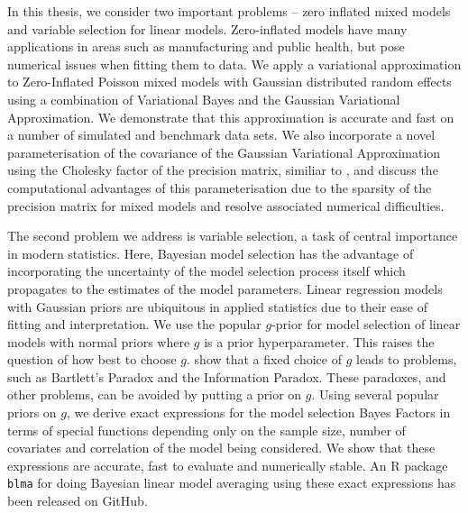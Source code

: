\documentclass[PhD,stats]{usydthesis}[12pt]
\begin{document}
In this thesis, we consider two important problems -- zero inflated mixed models and variable selection for
linear models. Zero-inflated models have many applications in areas such as manufacturing and public health,
but pose numerical issues when fitting them to data. We apply a variational approximation to Zero-Inflated
Poisson mixed models with Gaussian distributed random effects using a combination of Variational Bayes and the
Gaussian Variational Approximation. We demonstrate that this approximation is accurate and fast on a number of
simulated and benchmark data sets. We also incorporate a novel parameterisation of the covariance of the
Gaussian Variational Approximation using the Cholesky factor of the precision matrix, similiar to
\cite{Tan2016}, and discuss the computational advantages of this parameterisation due to the sparsity of the
precision matrix for mixed models and resolve associated numerical difficulties.

The second problem we address is variable selection, a task of central importance in modern statistics. Here,
Bayesian model selection has the advantage of incorporating the uncertainty of the model selection process
itself which propagates to the estimates of the model  parameters. Linear regression models with Gaussian
priors are ubiquitous in applied statistics due to their ease of fitting and interpretation. We use the
popular $g$-prior \cite{Zellner1986} for model selection of linear models with normal priors where $g$ is a
prior hyperparameter. This raises the question of how best to choose $g$. \cite{Liang2008} show that a fixed
choice of $g$ leads to problems, such as Bartlett's Paradox and the Information Paradox. These paradoxes, and
other problems, can be avoided by putting a prior on $g$. Using several popular priors on $g$, we derive exact
expressions for the model selection Bayes Factors in terms of special functions depending only on  the sample
size, number of covariates and correlation of the model being considered. We show that these expressions are
accurate, fast to evaluate and numerically stable. An R package \texttt{blma} for doing Bayesian linear model
averaging using these exact expressions has been  released on GitHub.
\end{document}
